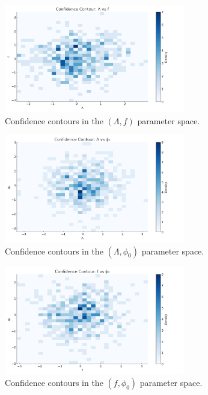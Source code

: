 \documentclass[12pt]{article}
\begin{document}
\begin{figure}[ht]
\centering
\includegraphics[width=0.7\textwidth]{contour_Lambda_f.png}
\caption{Confidence contours in the $(\Lambda, f)$ parameter space.}
\label{fig:contour_Lambda_f}
\end{figure}

\begin{figure}[ht]
\centering
\includegraphics[width=0.7\textwidth]{contour_Lambda_phi0.png}
\caption{Confidence contours in the $(\Lambda, \phi_0)$ parameter space.}
\label{fig:contour_Lambda_phi0}
\end{figure}

\begin{figure}[ht]
\centering
\includegraphics[width=0.7\textwidth]{contour_f_phi0.png}
\caption{Confidence contours in the $(f, \phi_0)$ parameter space.}
\label{fig:contour_f_phi0}
\end{figure}
\end{document}
